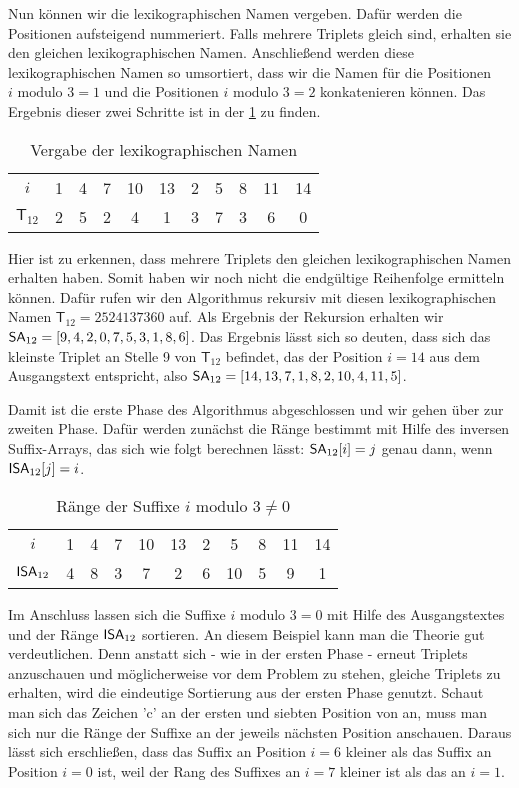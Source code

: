 Nun können wir die lexikographischen Namen vergeben. Dafür werden die Positionen aufsteigend nummeriert. Falls mehrere Triplets gleich sind, erhalten sie den gleichen lexikographischen Namen. Anschließend werden diese lexikographischen Namen so umsortiert, dass wir die Namen für die Positionen $i \text{ modulo } 3 = 1$ und die Positionen $i \text{ modulo } 3 = 2$ konkatenieren können. Das Ergebnis dieser zwei Schritte ist in der \cref{tab:lexNamen} zu finden.

\begin{table}[H]
	\centering
	\begin{tabular}{c| c c c c c c c c c c}
		$i$ & 1 & 4 & 7 & 10 & 13 & 2 & 5 & 8 & 11 & 14\\
		$\mathsf{T}_{12}$ & 2 & 5 & 2 & 4 & 1 & 3 & 7 & 3 & 6 & 0
	\end{tabular}
	\caption{Vergabe der lexikographischen Namen}
	\label{tab:lexNamen}
\end{table}

Hier ist zu erkennen, dass mehrere Triplets den gleichen lexikographischen Namen erhalten haben. Somit haben wir noch nicht die endgültige Reihenfolge ermitteln können. Dafür rufen wir den Algorithmus rekursiv mit diesen lexikographischen Namen $\mathsf{T}_{12} = 2524137360$ auf. Als Ergebnis der Rekursion erhalten wir $\sa_{12} = [9, 4, 2, 0, 7, 5, 3, 1, 8, 6]$. Das Ergebnis lässt sich so deuten, dass sich das kleinste Triplet an Stelle 9 von $\mathsf{T}_{12}$ befindet, das der Position $i = 14$ aus dem Ausgangstext  entspricht, also $\sa_{12} = [14, 13, 7, 1, 8, 2, 10, 4, 11, 5]$. 

Damit ist die erste Phase des Algorithmus abgeschlossen und wir gehen über zur zweiten Phase. Dafür werden zunächst die Ränge bestimmt mit Hilfe des inversen Suffix-Arrays, das sich wie folgt berechnen lässt: $\sa_{12}[i] = j$ genau dann, wenn $\isa_{12}[j] = i$.

\begin{table}[H]
	\centering
	\begin{tabular}{c| c c c c c c c c c c}
		$i$ & 1 & 4 & 7 & 10 & 13 & 2 & 5 & 8 & 11 & 14 \\
		$\isa_{12}$ & 4 & 8 & 3 & 7 & 2 & 6 & 10 & 5 & 9 & 1
	\end{tabular}
	\caption{Ränge der Suffixe $i \text{ modulo } 3 \neq 0$}
	\label{tab:ergebnis_rek}
\end{table}

Im Anschluss lassen sich die Suffixe $i \text{ modulo } 3 = 0$ mit Hilfe des Aus\-gangs\-text\-es  und der Ränge $\isa_{12}$ sortieren. An diesem Beispiel kann man die Theorie gut verdeutlichen. Denn anstatt sich - wie in der ersten Phase - erneut Triplets anzuschauen und möglicherweise vor dem Problem zu stehen, gleiche Triplets zu erhalten, wird die eindeutige Sortierung aus der ersten Phase genutzt. Schaut man sich das Zeichen 'c' an der ersten und siebten Position von  an, muss man sich nur die Ränge der Suffixe an der jeweils nächsten Position anschauen. Daraus lässt sich erschließen, dass das Suffix an Position $i = 6$ kleiner als das Suffix an Position $i = 0$ ist, weil der Rang des Suffixes an $i = 7$ kleiner ist als das an $i = 1$.

